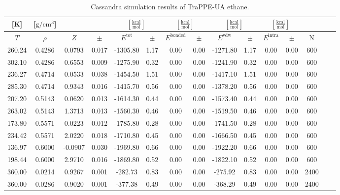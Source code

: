 \documentclass[%
 aip,
 jcp,
 sd,%
 amsmath,amssymb,
]{revtex4-1}
\begin{document}
\begin{table}[!htbp]
\centering
\caption{Cassandra simulation results of TraPPE-UA ethane.}
\label{tab:NIST-VAL-C12-FTT}
\begin{ruledtabular}
\begin{tabular}{ccccccccccccccc}
[K] & [$\mathrm{g/cm^3}$] &  &  & \multicolumn{2}{c}{$[\frac{\mathrm{kcal}}{\mathrm{mol}}]$} & \multicolumn{2}{c}{$[\frac{\mathrm{kcal}}{\mathrm{mol}}]$} & \multicolumn{2}{c}{$[\frac{\mathrm{kcal}}{\mathrm{mol}}]$} &\multicolumn{2}{c}{$[\frac{\mathrm{kcal}}{\mathrm{mol}}]$} & \\
\hline
$T$ & $\rho$ & $Z$ & $\pm$ & $E^{\mathrm{tot}}$ & $\pm$ & $E^{\mathrm{bonded}}$ & $\pm$ & $E^{\mathrm{vdw}}$ & $\pm$ & $E^{\mathrm{intra}}$ & $\pm$ & N\\
\hline
260.24 & 0.4286 & 0.0793  & 0.017 & -1305.80 & 1.17 & 0.00 & 0.00 & -1271.80 & 1.17 & 0.00 & 0.00 & 600  \\
302.10 & 0.4286 & 0.6553  & 0.009 & -1275.90 & 0.32 & 0.00 & 0.00 & -1241.90 & 0.32 & 0.00 & 0.00 & 600  \\
236.27 & 0.4714 & 0.0533  & 0.038 & -1454.50 & 1.51 & 0.00 & 0.00 & -1417.10 & 1.51 & 0.00 & 0.00 & 600  \\
285.30 & 0.4714 & 0.9343  & 0.016 & -1415.70 & 0.56 & 0.00 & 0.00 & -1378.20 & 0.56 & 0.00 & 0.00 & 600  \\
207.20 & 0.5143 & 0.0620  & 0.013 & -1614.30 & 0.44 & 0.00 & 0.00 & -1573.40 & 0.44 & 0.00 & 0.00 & 600  \\
263.02 & 0.5143 & 1.3713  & 0.013 & -1560.30 & 0.46 & 0.00 & 0.00 & -1519.50 & 0.46 & 0.00 & 0.00 & 600  \\
173.80 & 0.5571 & 0.0223  & 0.012 & -1785.80 & 0.28 & 0.00 & 0.00 & -1741.50 & 0.28 & 0.00 & 0.00 & 600  \\
234.42 & 0.5571 & 2.0220  & 0.018 & -1710.80 & 0.45 & 0.00 & 0.00 & -1666.50 & 0.45 & 0.00 & 0.00 & 600  \\
136.97 & 0.6000 & -0.0907 & 0.030 & -1969.80 & 0.66 & 0.00 & 0.00 & -1922.20 & 0.66 & 0.00 & 0.00 & 600  \\
198.44 & 0.6000 & 2.9710  & 0.016 & -1869.80 & 0.52 & 0.00 & 0.00 & -1822.10 & 0.52 & 0.00 & 0.00 & 600  \\
360.00 & 0.0214 & 0.9267  & 0.001 & -282.73  & 0.83 & 0.00 & 0.00 & -275.92  & 0.83 & 0.00 & 0.00 & 2400 \\
360.00 & 0.0286 & 0.9020  & 0.001 & -377.38  & 0.49 & 0.00 & 0.00 & -368.29  & 0.49 & 0.00 & 0.00 & 2400 \\

\end{tabular}
\end{ruledtabular}
\end{table}
\end{document}

